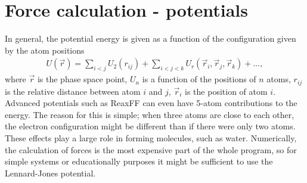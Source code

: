 \section{Force calculation - potentials}
\label{sec:md_forces}
In general, the potential energy is given as a function of the configuration given by the atom positions
\begin{align}
	U(\vec{r}) = \sum_{i<j}U_2(r_{ij}) + \sum_{i<j<k} U_r(\vec r_i, \vec r_j, \vec r_k) + ...,
\end{align}
where $\vec r$ is the phase space point, $U_n$ is a function of the positions of $n$ atoms, $r_{ij}$ is the relative distance between atom $i$ and $j$, $\vec r_i$ is the position of atom $i$. Advanced potentials such as ReaxFF can even have 5-atom contributions to the energy\cite{van2001reaxff}. The reason for this is simple; when three atoms are close to each other, the electron configuration might be different than if there were only two atoms. These effects play a large role in forming molecules, such as water. Numerically, the calculation of forces is the most expensive part of the whole program, so for simple systems or educationally purposes it might be sufficient to use the Lennard-Jones potential.
